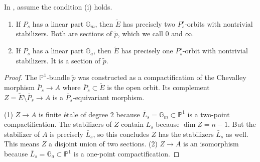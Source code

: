 \documentclass[reqno, letterpaper]{amsart}
\numberwithin{equation}{subsection}
\let\to\longrightarrow
\newcommand{\GG}{\mathbb{G}}
\newcommand{\PP}{\mathbb{P}}
\begin{document}
		\begin{lemma} \label{lem:E normalization structure-semistable}
			In , assume the condition (i) holds.
			\begin{enumerate}
				\item If $P_s$ has a linear part $\GG_m$, then $\tilde E$ has precisely two $P^\circ_s$-orbits with nontrivial stabilizers. Both are sections of $\tilde p$, which we call $0$ and $\infty$.
				\item If $P_s$ has a linear part $\GG_a$, then $\tilde E$ has precisely one $P^\circ_s$-orbit with nontrivial stabilizers. It is a section of $\tilde p$.
			\end{enumerate}
		\end{lemma}
		\begin{proof}
			The $\PP^1$-bundle $\tilde p$ was constructed as a compactification of the Chevalley morphism $\bar P_s \to A$ where $\bar P_s \subset \tilde E$ is the open orbit. Its complement $Z = \tilde E \setminus \bar P_s \to A$ is a $\bar P_s$-equivariant morphism.
			
			\medskip
			
			(1) $Z \to A$ is finite \'etale of degree $2$ because $\bar L_s = \GG_m \subset \PP^1$ is a two-point compactification. The stabilizers of $Z$ contain $\bar L_s$ because $\dim Z = n-1$. But the stabilizer of $A$ is precisely $\bar L_s$, so this concludes $Z$ has the stabilizers $\bar L_s$ as well. This means $Z$ a disjoint union of two sections. (2) $Z \to A$ is an isomorphism because $\bar L_s = \GG_a \subset \PP^1$ is a one-point compactification.
		\end{proof}
		
\end{document}
